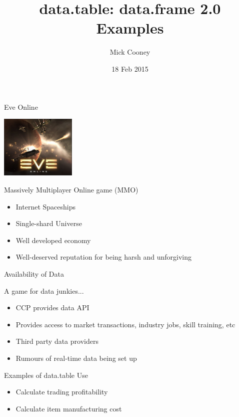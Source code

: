 \documentclass[12pt]{beamer}
\title[data.table: data.frame 2.0 (Examples)]{data.table: data.frame 2.0\\Examples}
\author{Mick Cooney}
\date{18 Feb 2015}
\begin{document}
\begin{frame}
\titlepage
\end{frame}



\begin{frame}[fragile]{Eve Online}

\begin{center}
\includegraphics[height=3cm]{eve_online.jpg}
\end{center}

Massively Multiplayer Online game (MMO)

\begin{itemize}
\item<2-> Internet Spaceships
\item<3-> Single-shard Universe
\item<4-> Well developed economy
\item<5-> Well-deserved reputation for being harsh and unforgiving
\end{itemize}

\end{frame}


\begin{frame}[fragile]{Availability of Data}

A game for data junkies...

\begin{itemize}
\item<2-> CCP provides data API
\item<3-> Provides access to market transactions, industry jobs, skill training, etc
\item<4-> Third party data providers
\item<5-> Rumours of real-time data being set up
\end{itemize}

\end{frame}


\begin{frame}[fragile]{Examples of data.table Use}

\begin{itemize}
\item<2-> Calculate trading profitability
\item<3-> Calculate item manufacturing cost
\end{itemize}

\end{frame}
\end{document}
